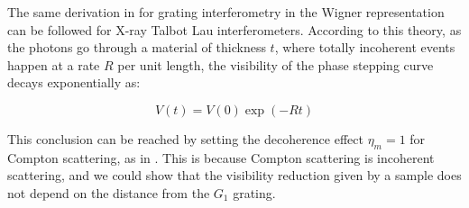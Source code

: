 The same derivation in \cite{Hornberger_2004} for grating interferometry in the Wigner representation can be followed for X-ray Talbot Lau interferometers. According to this theory, as the photons go through a material of thickness $t$, where totally incoherent events happen at a rate $R$ per unit length, the visibility of the phase stepping curve decays exponentially as:

\begin{equation}
V(t) = V(0)\exp(-Rt)
\end{equation}

This conclusion can be reached by setting the decoherence effect $\eta_m = 1$ 
for Compton scattering, as in \cite{Hornberger_2003}. This is because Compton scattering is
incoherent scattering, and we could show that the visibility reduction given
by a sample does not depend on the distance from the $G_1$ grating.